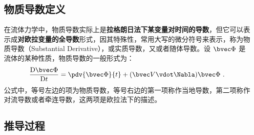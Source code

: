 
\begin{issues}
\issueDraft
\end{issues}

\subsection{物质导数定义}

在流体力学中，物质导数实际上是\textbf{拉格朗日法下某变量对时间的导数}，但它可以表示成\textbf{对欧拉变量的全导数}形式，因其特殊性，常用大写的微分符号来表示，称为物质导数（Substantial  Derivative），或实质导数，又或者随体导数。设 $\bvec \Phi$ 是流体的某种性质，物质导数的一般形式为：
\begin{equation}
\frac{\mathrm{D}\bvec \Phi }{\mathrm{D} t}=\pdv{\bvec \Phi}{t}+(\bvec V \vdot \Nabla)\bvec \Phi~.
\end{equation}
公式中，等号左边的项为物质导数，等号右边的第一项称作当地导数，第二项称作对流导数或者牵连导数，这两项是欧拉法下的描述。

\subsection{推导过程}
